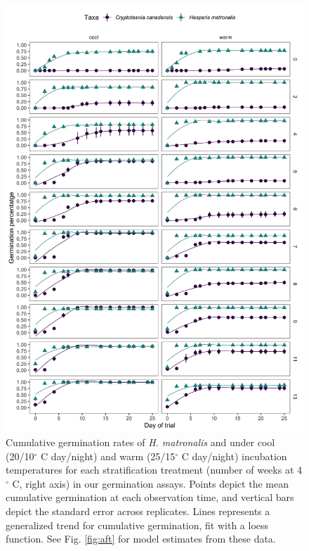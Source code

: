 \documentclass{article}[11pt]
\begin{document}
\begin{figure}[h!]
    \centering
\includegraphics[width=.75\textwidth]{..//figure/crp_hesp2.jpeg}
\caption{Cumulative germination rates of \textit{H. matronalis} and  under cool (20/10$^{\circ}$ C day/night) and warm (25/15$^{\circ}$ C day/night) incubation temperatures for each stratification treatment (number of weeks at 4$^{\circ}$ C, right axis) in our germination assays. Points depict the mean cumulative germination at each observation time, and vertical bars depict the standard error across replicates. Lines represents a generalized trend for cumulative germination, fit with a loess function. See Fig. \ref{fig:aft} for model estimates from these data.}%
   \label{fig:timecourse}
\end{figure}
\end{document}

